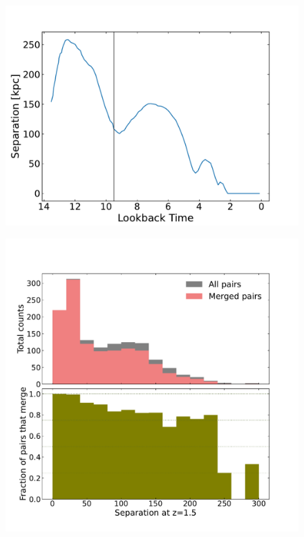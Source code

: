 \documentclass[twocolumn]{aastex631}
\begin{document}
\begin{figure}[htb]
    \centering
    \includegraphics[width=\columnwidth]{plots/2_pull-orbits/example-orbit.pdf}
    \caption{}
\end{figure}

\begin{figure}[htb]
    \centering
    \includegraphics[width=\columnwidth]{plots/1_merged-fraction/mergedfraction.pdf}
    \caption{}
\end{figure}
\end{document}
